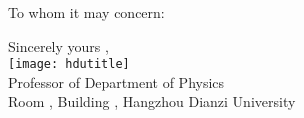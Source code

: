 \documentclass[stationery]{hduthesis}
\begin{document}
\maketitle

To whom it may concern:

\lipsum[1-2]

\vspace{\baselineskip} \raggedleft

Sincerely yours ,\\[2ex]
\texttt{[image: hdutitle]}\\[2ex]
Professor of Department of Physics\\
Room , Building , Hangzhou Dianzi University
\end{document}
